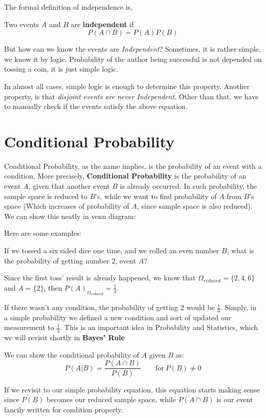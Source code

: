 The formal definition of independence is,

\begin{definition}
    Two events $A$ and $B$ are \textbf{independent}  if 
    $$ P(A \cap B) = P(A)P(B)$$ 
\end{definition}
\par

But how can we  know the events are \textit{Independent}? Sometimes, it is rather simple, we know it by logic. Probability of the author being successful is not depended on tossing a coin, it is just simple logic.

In almost all cases, simple logic is enough to determine this property. Another property, is that \textit{disjoint events are never Independent}. Other than that, we have to manually check if the events satisfy the above equation.
\section{Conditional Probability}
Conditional Probability, as the name implies, is the probability of an event with a condition. More precisely, \textbf{Conditional Probability}  is the probability of an event $A$, given that another event $B$ is already occurred. In such probability, the sample space is reduced to $B$'s, while we want to find probability of $A$ from $B$'s space (Which increases of probability of $A$, since sample space is also reduced). We can show this neatly in venn diagram:

\par 
Here are some examples:
\begin{example}
    If we tossed a six sided dice one time, and we rolled an even number $B$, what is the probability of getting number $2$, event $A$?
\end{example}
Since the first toss' result is already happened, we know that  $\Omega_{reduced}=\{2,4,6\}$ and  $A = \{2\}$, then $P(A)_{\Omega_{reduced}}=\frac{1}{3}$. 

If there wasn't any condition, the probability of getting $2$ would be $\frac{1}{6}$. Simply, in a simple probability we defined a new condition and sort of updated our measurement to $\frac{1}{3}$. This is an important idea in Probability and Statistics, which we will revisit shortly in \textbf{Bayes' Rule}
\par 
We can show the conditional probability of $A$ given $B$ as:
$$ P(A | B) = \frac{P(A \cap B)}{P(B)} \qquad \text{for}\ P(B) \neq 0$$
\par
If we revisit to our simple probability equation, this equation starts making sense since $P(B)$ becomes our reduced sample space, while $P(A \cap B)$ is our event fancily written for condition property.

